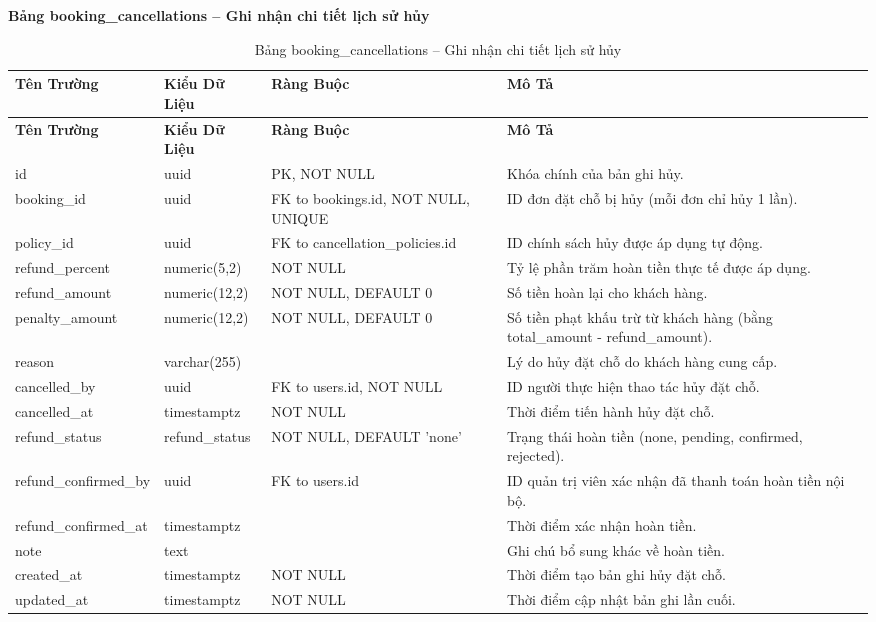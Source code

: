 \textbf{Bảng booking\_\allowbreak cancellations -- Ghi nhận chi tiết lịch sử hủy}
\label{table:booking_cancellations}
\begin{longtable}{|p{3cm}|p{2.5cm}|p{3.5cm}|p{5cm}|}
\caption{Bảng booking\_\allowbreak cancellations -- Ghi nhận chi tiết lịch sử hủy} \\
\hline
\textbf{Tên Trường} & \textbf{Kiểu Dữ Liệu} & \textbf{Ràng Buộc} & \textbf{Mô Tả} \\
\hline
\endfirsthead
\hline
\textbf{Tên Trường} & \textbf{Kiểu Dữ Liệu} & \textbf{Ràng Buộc} & \textbf{Mô Tả} \\
\hline
\endhead
id & uuid & PK, NOT NULL & Khóa chính của bản ghi hủy. \\
\hline
booking\_id & uuid & FK to bookings.id, NOT NULL, UNIQUE & ID đơn đặt chỗ bị hủy (mỗi đơn chỉ hủy 1 lần). \\
\hline
policy\_id & uuid & FK to cancellation\_\allowbreak policies.id & ID chính sách hủy được áp dụng tự động. \\
\hline
refund\_percent & numeric(5,2) & NOT NULL & Tỷ lệ phần trăm hoàn tiền thực tế được áp dụng. \\
\hline
refund\_amount & numeric(12,2) & NOT NULL, DEFAULT 0 & Số tiền hoàn lại cho khách hàng. \\
\hline
penalty\_amount & numeric(12,2) & NOT NULL, DEFAULT 0 & Số tiền phạt khấu trừ từ khách hàng (bằng total\_amount - refund\_amount). \\
\hline
reason & varchar(255) & & Lý do hủy đặt chỗ do khách hàng cung cấp. \\
\hline
cancelled\_by & uuid & FK to users.id, NOT NULL & ID người thực hiện thao tác hủy đặt chỗ. \\
\hline
cancelled\_at & timestamptz & NOT NULL & Thời điểm tiến hành hủy đặt chỗ. \\
\hline
refund\_status & refund\_status & NOT NULL, DEFAULT 'none' & Trạng thái hoàn tiền (none, pending, confirmed, rejected). \\
\hline
refund\_\allowbreak confirmed\_\allowbreak by & uuid & FK to users.id & ID quản trị viên xác nhận đã thanh toán hoàn tiền nội bộ. \\
\hline
refund\_confirmed\_at & timestamptz & & Thời điểm xác nhận hoàn tiền. \\
\hline
note & text & & Ghi chú bổ sung khác về hoàn tiền. \\
\hline
created\_at & timestamptz & NOT NULL & Thời điểm tạo bản ghi hủy đặt chỗ. \\
\hline
updated\_at & timestamptz & NOT NULL & Thời điểm cập nhật bản ghi lần cuối. \\
\end{longtable}

